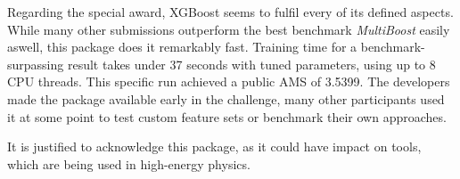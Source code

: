 Regarding the special award, XGBoost seems to fulfil every of its defined aspects. While many other submissions outperform the best benchmark \emph{MultiBoost} easily aswell, this package does it remarkably fast. Training time for a benchmark-surpassing result takes under 37 seconds with tuned parameters, using up to 8 CPU threads. This specific run achieved a public AMS of 3.5399.
The developers made the package available early in the challenge, many other participants used it at some point to test custom feature sets or benchmark their own approaches.

It is justified to acknowledge this package, as it could have impact on tools, which are being used in high-energy physics\cite{HEPml}.
